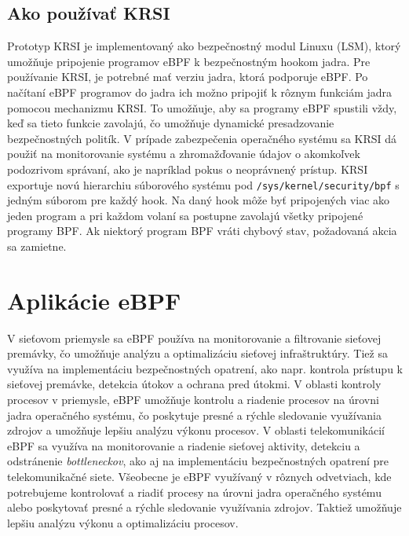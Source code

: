 \subsection*{Ako používať KRSI}
Prototyp KRSI je implementovaný ako bezpečnostný modul Linuxu (LSM), ktorý umožňuje pripojenie programov eBPF k bezpečnostným hookom jadra. 
Pre používanie KRSI, je potrebné mať verziu jadra, ktorá podporuje eBPF. Po načítaní eBPF programov do jadra ich možno pripojiť k rôznym 
funkciám jadra pomocou mechanizmu KRSI. To umožňuje, aby sa programy eBPF spustili vždy, keď sa tieto funkcie zavolajú, čo umožňuje dynamické 
presadzovanie bezpečnostných politík. V prípade zabezpečenia operačného systému sa KRSI dá použiť na monitorovanie systému a zhromažďovanie údajov 
o akomkoľvek podozrivom správaní, ako je napríklad pokus o neoprávnený prístup. KRSI exportuje novú hierarchiu súborového systému 
pod \texttt{/sys/kernel/security/bpf} s jedným súborom pre každý hook. Na daný hook môže byť pripojených viac ako jeden program a pri 
každom volaní sa postupne zavolajú všetky pripojené programy BPF. Ak niektorý program BPF vráti chybový stav, požadovaná akcia sa zamietne.

\section{Aplikácie eBPF}
V sieťovom priemysle sa eBPF používa na monitorovanie a filtrovanie sieťovej premávky, čo umožňuje analýzu a optimalizáciu sieťovej infraštruktúry. 
Tiež sa využíva na implementáciu bezpečnostných opatrení, ako napr. kontrola prístupu k sieťovej premávke, detekcia útokov a ochrana pred útokmi. 
V oblasti kontroly procesov v priemysle, eBPF umožňuje kontrolu a riadenie procesov na úrovni jadra operačného systému, čo poskytuje presné a rýchle sledovanie 
využívania zdrojov a umožňuje lepšiu analýzu výkonu procesov. V oblasti telekomunikácií eBPF sa využíva na monitorovanie a riadenie sieťovej aktivity, 
detekciu a odstránenie \emph{bottleneckov}, ako aj na implementáciu bezpečnostných opatrení pre telekomunikačné siete. Všeobecne je eBPF využívaný v rôznych odvetviach, 
kde potrebujeme kontrolovať a riadiť procesy na úrovni jadra operačného systému alebo poskytovať presné a rýchle sledovanie využívania zdrojov. Taktiež umožňuje lepšiu analýzu výkonu 
a optimalizáciu procesov.

